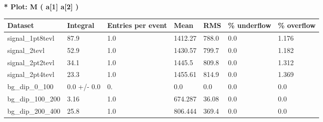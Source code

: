 \documentclass[a4paper, 10pt]{article}
\begin{document}
\textbf{* Plot: M ( a[1] a[2] ) }\\
   \begin{table}[H]
  \begin{center}
    \begin{tabular}{|m{23.0mm}|m{23.0mm}|m{18.0mm}|m{19.0mm}|m{19.0mm}|m{19.0mm}|m{19.0mm}|}
      \hline
      {\cellcolor{yellow}         Dataset}& {\cellcolor{yellow}         Integral}& {\cellcolor{yellow}         Entries per event}& {\cellcolor{yellow}         Mean}& {\cellcolor{yellow}         RMS}& {\cellcolor{yellow}         \% underflow}& {\cellcolor{yellow}         \% overflow}\\
      \hline
      {\cellcolor{white}         signal\_1pt8tevl}& {\cellcolor{white}         87.9}& {\cellcolor{white}         1.0}& {\cellcolor{white}         1412.27}& {\cellcolor{white}         788.0}& {\cellcolor{green}         0.0}& {\cellcolor{green}         1.176}\\
      \hline
      {\cellcolor{white}         signal\_2tevl}& {\cellcolor{white}         52.9}& {\cellcolor{white}         1.0}& {\cellcolor{white}         1430.57}& {\cellcolor{white}         799.7}& {\cellcolor{green}         0.0}& {\cellcolor{green}         1.182}\\
      \hline
      {\cellcolor{white}         signal\_2pt2tevl}& {\cellcolor{white}         34.1}& {\cellcolor{white}         1.0}& {\cellcolor{white}         1445.5}& {\cellcolor{white}         809.8}& {\cellcolor{green}         0.0}& {\cellcolor{green}         1.312}\\
      \hline
      {\cellcolor{white}         signal\_2pt4tevl}& {\cellcolor{white}         23.3}& {\cellcolor{white}         1.0}& {\cellcolor{white}         1455.61}& {\cellcolor{white}         814.9}& {\cellcolor{green}         0.0}& {\cellcolor{green}         1.369}\\
      \hline
      {\cellcolor{white}         bg\_dip\_0\_100}& {\cellcolor{white}         0.0 +/\-- 0.0}& {\cellcolor{white}         0.}& {\cellcolor{white}         0.0}& {\cellcolor{white}         0.0}& {\cellcolor{green}         0.0}& {\cellcolor{green}         0.0}\\
      \hline
      {\cellcolor{white}         bg\_dip\_100\_200}& {\cellcolor{white}         3.16}& {\cellcolor{white}         1.0}& {\cellcolor{white}         674.287}& {\cellcolor{white}         36.08}& {\cellcolor{green}         0.0}& {\cellcolor{green}         0.0}\\
      \hline
      {\cellcolor{white}         bg\_dip\_200\_400}& {\cellcolor{white}         25.8}& {\cellcolor{white}         1.0}& {\cellcolor{white}         806.444}& {\cellcolor{white}         369.4}& {\cellcolor{green}         0.0}& {\cellcolor{green}         0.0}\\

\end{tabular}
\end{center}
\end{table}
\end{document}
